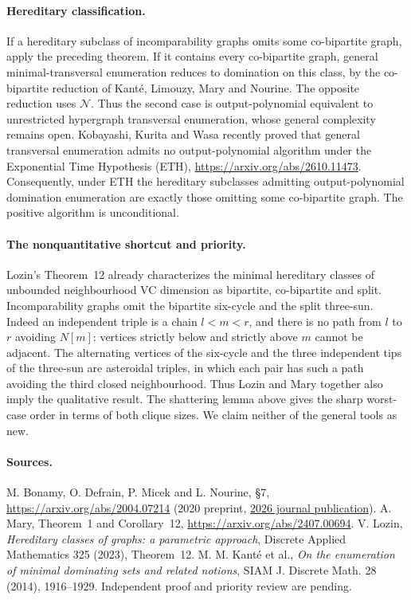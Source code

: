 \documentclass[11pt]{article}
\begin{document}
\paragraph{Hereditary classification.} If a hereditary subclass of incomparability graphs omits some co-bipartite graph, apply the preceding theorem. If it contains every co-bipartite graph, general minimal-transversal enumeration reduces to domination on this class, by the co-bipartite reduction of Kant\'e, Limouzy, Mary and Nourine. The opposite reduction uses $\mathcal N$. Thus the second case is output-polynomial equivalent to unrestricted hypergraph transversal enumeration, whose general complexity remains open. Kobayashi, Kurita and Wasa recently proved that general transversal enumeration admits no output-polynomial algorithm under the Exponential Time Hypothesis (ETH), \url{https://arxiv.org/abs/2610.11473}. Consequently, under ETH the hereditary subclasses admitting output-polynomial domination enumeration are exactly those omitting some co-bipartite graph. The positive algorithm is unconditional.

\paragraph{The nonquantitative shortcut and priority.} Lozin's Theorem~12 already characterizes the minimal hereditary classes of unbounded neighbourhood VC dimension as bipartite, co-bipartite and split. Incomparability graphs omit the bipartite six-cycle and the split three-sun. Indeed an independent triple is a chain $l<m<r$, and there is no path from $l$ to $r$ avoiding $N[m]$: vertices strictly below and strictly above $m$ cannot be adjacent. The alternating vertices of the six-cycle and the three independent tips of the three-sun are asteroidal triples, in which each pair has such a path avoiding the third closed neighbourhood. Thus Lozin and Mary together also imply the qualitative result. The shattering lemma above gives the sharp worst-case order in terms of both clique sizes. We claim neither of the general tools as new.

\paragraph{Sources.} M. Bonamy, O. Defrain, P. Micek and L. Nourine, §7, \url{https://arxiv.org/abs/2004.07214} (2020 preprint, \href{https://doi.org/10.1016/j.disc.2025.114904}{2026 journal publication}). A. Mary, Theorem~1 and Corollary~12, \url{https://arxiv.org/abs/2407.00694}. V. Lozin, \emph{Hereditary classes of graphs: a parametric approach}, Discrete Applied Mathematics 325 (2023), Theorem~12. M. M. Kant\'e et al., \emph{On the enumeration of minimal dominating sets and related notions}, SIAM J. Discrete Math. 28 (2014), 1916--1929. Independent proof and priority review are pending.
\end{document}
